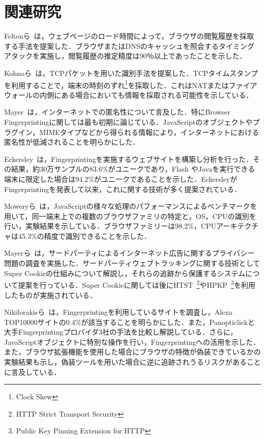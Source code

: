 \newpage
\section{関連研究}
Feltenら~\cite{felten2000timing}は，ウェブページのロード時間によって，ブラウザの閲覧履歴を採取する手法を提案した．ブラウザまたはDNSのキャッシュを照会するタイミングアタックを実施し，閲覧履歴の推定精度は90％以上であったことを示した．

Kohnoら~\cite{kohno2005remote}は，TCPパケットを用いた識別手法を提案した．TCPタイムスタンプを利用することで，端末の時刻のずれ\footnote{Clock Skew}を採取した．これはNATまたはファイアウォールの内側にある場合においても情報を採取される可能性を示している．

Mayer~\cite{mayer2009any}は，インターネットでの匿名性について言及した．特にBrowser Fingerprintingに関しては最も初期に論じている．JavaScriptのオブジェクトやプラグイン，MIMEタイプなどから得られる情報により，インターネットにおける匿名性が低減されることを明らかにした．

Eckersley~\cite{eckersley2010unique}は，Fingerprintingを実施するウェブサイトを構築し分析を行った．その結果，約30万サンプルの83.6\%がユニークであり，Flash やJavaを実行できる端末に限定した場合は94.2\%がユニークであることを示した．EckersleyがFingerprintingを発表して以来，これに関する技術が多く提案されている．

Moweryら~\cite{mowery2011fingerprinting}は，JavaScriptの様々な処理のパフォーマンスによるベンチマークを用いて，同一端末上での複数のブラウザファミリの特定と，OS，CPUの識別を行い，実験結果を示している．ブラウザファミリーは98.2\%，CPUアーキテクチャは45.3\%の精度で識別できることを示した．

Mayerら~\cite{mayer2012third}は，サードパーティによるインターネット広告に関するプライバシー問題の調査を実施した．サードパーティウェブトラッキングに関する技術としてSuper Cookieの仕組みについて解説し，それらの追跡から保護するシステムについて提案を行っている．Super Cookieに関しては後にHTST~\footnote{HTTP Strict Transport Security}やHPKP~\footnote{Public Key Pinning Extension for HTTP}を利用したものが実施されている．

Nikiforakisら~\cite{nikiforakis2013cookieless}は，Fingerprintingを利用しているサイトを調査し，Alexa TOP10000サイトの0.4\%が該当することを明らかにした．また，Panopticlickと大手Fingerprintingプロバイダ3社の手法を比較し解説している．さらに，JavaScriptオブジェクトに特別な操作を行い，Fingerprintingへの活用を示した．また，ブラウザ拡張機能を使用した場合にブラウザの特徴が偽装できているかの実験結果も示し，偽装ツールを用いた場合に逆に追跡されうるリスクがあることに言及している．

